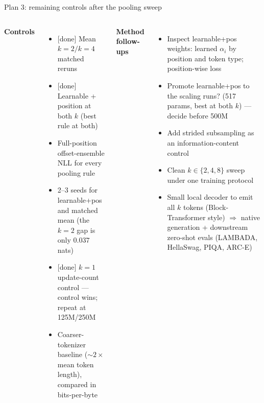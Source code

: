 \documentclass[10pt,aspectratio=169]{beamer}
\newcommand{\good}[1]{\textcolor{okgreen}{#1}}
\begin{document}
\begin{frame}{Plan 3: remaining controls after the pooling sweep}
  \small
  \begin{columns}[T]
    \textbf{Controls}
    \begin{itemize}
      \item \good{[done]} Mean $k{=}2/k{=}4$ matched reruns
      \item \good{[done]} Learnable + position at both $k$ (best rule at
            both)
      \item Full-position offset-ensemble NLL for every pooling rule
      \item 2--3 seeds for learnable+pos and matched mean (the $k{=}2$ gap
            is only $0.037$ nats)
      \item \good{[done]} $k{=}1$ update-count control --- control wins;
            repeat at 125M/250M
      \item Coarser-tokenizer baseline ($\sim\!2\times$ mean token length),
            compared in bits-per-byte
    \end{itemize}

    \textbf{Method follow-ups}
    \begin{itemize}
      \item Inspect learnable+pos weights: learned $\alpha_i$ by position
            and token type; position-wise loss
      \item Promote learnable+pos to the scaling runs? (517 params, best at
            both $k$) --- decide before 500M
      \item Add strided subsampling as an information-content control
      \item Clean $k \in \{2,4,8\}$ sweep under one training protocol
      \item Small local decoder to emit all $k$ tokens (Block-Transformer
            style) $\Rightarrow$ native generation + downstream zero-shot
            evals (LAMBADA, HellaSwag, PIQA, ARC-E)
    \end{itemize}
  \end{columns}
\end{frame}
\end{document}
